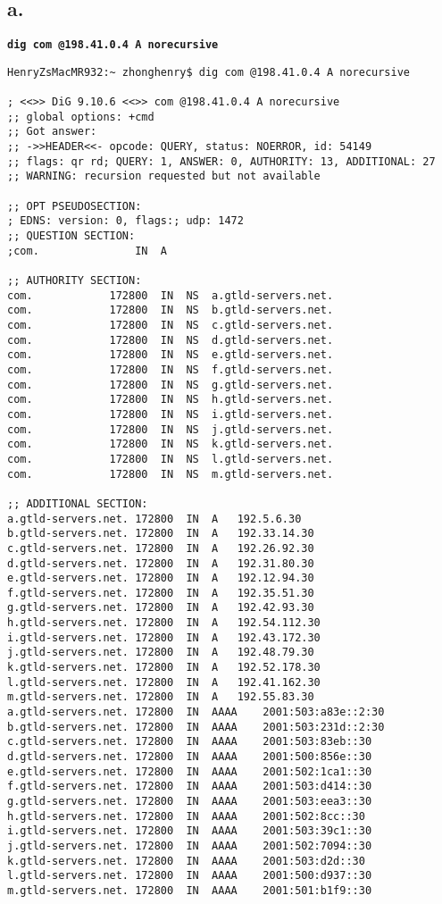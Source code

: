\documentclass[12pt]{article}
\newcommand{\ilc}{\texttt}
\begin{document}
\subsection{a.}
\textbf{\ilc{dig com @198.41.0.4 A norecursive}}
\begin{verbatim}
HenryZsMacMR932:~ zhonghenry$ dig com @198.41.0.4 A norecursive

; <<>> DiG 9.10.6 <<>> com @198.41.0.4 A norecursive
;; global options: +cmd
;; Got answer:
;; ->>HEADER<<- opcode: QUERY, status: NOERROR, id: 54149
;; flags: qr rd; QUERY: 1, ANSWER: 0, AUTHORITY: 13, ADDITIONAL: 27
;; WARNING: recursion requested but not available

;; OPT PSEUDOSECTION:
; EDNS: version: 0, flags:; udp: 1472
;; QUESTION SECTION:
;com.				IN	A

;; AUTHORITY SECTION:
com.			172800	IN	NS	a.gtld-servers.net.
com.			172800	IN	NS	b.gtld-servers.net.
com.			172800	IN	NS	c.gtld-servers.net.
com.			172800	IN	NS	d.gtld-servers.net.
com.			172800	IN	NS	e.gtld-servers.net.
com.			172800	IN	NS	f.gtld-servers.net.
com.			172800	IN	NS	g.gtld-servers.net.
com.			172800	IN	NS	h.gtld-servers.net.
com.			172800	IN	NS	i.gtld-servers.net.
com.			172800	IN	NS	j.gtld-servers.net.
com.			172800	IN	NS	k.gtld-servers.net.
com.			172800	IN	NS	l.gtld-servers.net.
com.			172800	IN	NS	m.gtld-servers.net.

;; ADDITIONAL SECTION:
a.gtld-servers.net.	172800	IN	A	192.5.6.30
b.gtld-servers.net.	172800	IN	A	192.33.14.30
c.gtld-servers.net.	172800	IN	A	192.26.92.30
d.gtld-servers.net.	172800	IN	A	192.31.80.30
e.gtld-servers.net.	172800	IN	A	192.12.94.30
f.gtld-servers.net.	172800	IN	A	192.35.51.30
g.gtld-servers.net.	172800	IN	A	192.42.93.30
h.gtld-servers.net.	172800	IN	A	192.54.112.30
i.gtld-servers.net.	172800	IN	A	192.43.172.30
j.gtld-servers.net.	172800	IN	A	192.48.79.30
k.gtld-servers.net.	172800	IN	A	192.52.178.30
l.gtld-servers.net.	172800	IN	A	192.41.162.30
m.gtld-servers.net.	172800	IN	A	192.55.83.30
a.gtld-servers.net.	172800	IN	AAAA	2001:503:a83e::2:30
b.gtld-servers.net.	172800	IN	AAAA	2001:503:231d::2:30
c.gtld-servers.net.	172800	IN	AAAA	2001:503:83eb::30
d.gtld-servers.net.	172800	IN	AAAA	2001:500:856e::30
e.gtld-servers.net.	172800	IN	AAAA	2001:502:1ca1::30
f.gtld-servers.net.	172800	IN	AAAA	2001:503:d414::30
g.gtld-servers.net.	172800	IN	AAAA	2001:503:eea3::30
h.gtld-servers.net.	172800	IN	AAAA	2001:502:8cc::30
i.gtld-servers.net.	172800	IN	AAAA	2001:503:39c1::30
j.gtld-servers.net.	172800	IN	AAAA	2001:502:7094::30
k.gtld-servers.net.	172800	IN	AAAA	2001:503:d2d::30
l.gtld-servers.net.	172800	IN	AAAA	2001:500:d937::30
m.gtld-servers.net.	172800	IN	AAAA	2001:501:b1f9::30


\end{verbatim}
\end{document}
